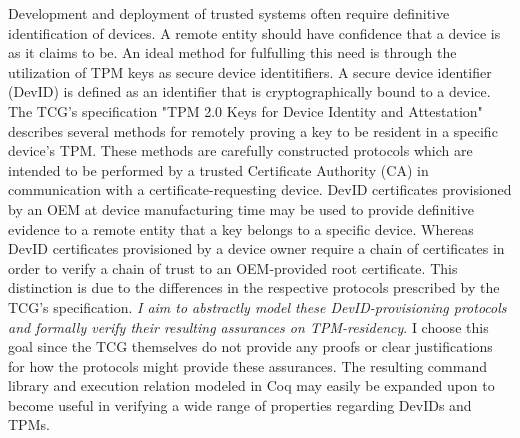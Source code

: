 \begin{abstractlong}



Development and deployment of trusted systems often require definitive identification of devices. A remote entity should have confidence that a device is as it claims to be. An ideal method for fulfulling this need is through the utilization of TPM keys as secure device identitifiers. A secure device identifier (DevID) is defined as an identifier that is cryptographically bound to a device. 
The TCG's specification "TPM 2.0 Keys for Device Identity and Attestation" describes several methods for remotely proving a key to be resident in a specific device's TPM. These methods are carefully constructed protocols which are intended to be performed by a trusted Certificate Authority (CA) in communication with a certificate-requesting device. DevID certificates provisioned by an OEM at device manufacturing time may be used to provide definitive evidence to a remote entity that a key belongs to a specific device. Whereas DevID certificates provisioned by a device owner require a chain of certificates in order to verify a chain of trust to an OEM-provided root certificate. This distinction is due to the differences in the respective protocols prescribed by the TCG's specification. \textit{I aim to abstractly model these DevID-provisioning protocols and formally verify their resulting assurances on TPM-residency}. I choose this goal since the TCG themselves do not provide any proofs or clear justifications for how the protocols might provide these assurances. The resulting command library and execution relation modeled in Coq may easily be expanded upon to become useful in verifying a wide range of properties regarding DevIDs and TPMs.

\end{abstractlong}




\begin{acknowledgementslong}

\end{acknowledgementslong}

